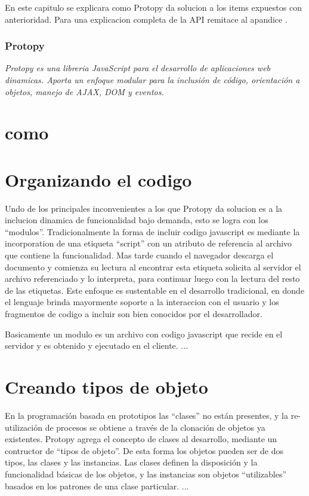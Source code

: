En este capitulo se explicara como Protopy da solucion a los items expuestos con
anterioridad. Para una explicacion completa de la API remitace al apandice
.

\subsubsection*{Protopy}
\textit{Protopy es una libreria JavaScript para el desarrollo de aplicaciones
web dinamicas. Aporta un enfoque modular para la inclusión de código,
orientación a objetos, manejo de AJAX, DOM y eventos.}

\section{como}

\section{Organizando el codigo}
Undo de los principales inconvenientes a los que Protopy da solucion es a la
inclucion dinamica de funcionalidad bajo demanda, esto se logra con los ``modulos''.
Tradicionalmente la forma de incluir codigo javascript es mediante la
incorporation de una etiqueta ``script'' con un atributo de referencia
al archivo que contiene la funcionalidad. Mas tarde cuando el navegador descarga
el documento y comienza su lectura al encontrar esta etiqueta solicita
al servidor el archivo referenciado y lo interpreta, para continuar luego con la
lectura del resto de las etiquetas.
Este enfoque es sustentable en el desarrollo tradicional, en donde el lenguaje
brinda mayormente soporte a la interaccion con el usuario y los fragmentos de
codigo a incluir son bien conocidos por el desarrollador.

Basicamente un modulo es un archivo con codigo javascript que recide en el
servidor y es obtenido y ejecutado en el cliente.
...

\section{Creando tipos de objeto}
En la programación basada en prototipos las ``clases'' no están presentes, y la re-utilización de procesos se obtiene a través de la clonación de objetos ya existentes. 
Protopy agrega el concepto de clases al desarrollo, mediante un contructor de ``tipos de objeto''. De esta forma los objetos pueden ser de dos tipos, las clases y las instancias. Las clases definen la disposición y la funcionalidad básicas de los objetos, y las instancias son objetos ``utilizables'' basados en los patrones de una clase particular.
...

